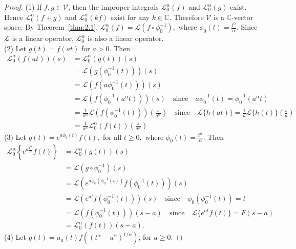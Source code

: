 \documentclass[two side,reqno,12pt]{amsart}
\numberwithin{equation}{section}
\theoremstyle{definition}
\begin{document}
\begin{proof}
 (1)  If \( f, g \in\mathcal{V} \), then the improper integrals \( \mathcal{L}_0^\alpha(f) \) and \( \mathcal{L}_0^\alpha(g) \) exist.
Hence \( \mathcal{L}_0^\alpha(f + g) \) and \( \mathcal{L}_0^\alpha(kf) \) exist for any \( k \in \mathbb{C} \).
Therefore \( \mathcal{V} \) is a \( \mathbb{C} \)-vector space.
By Theorem~\ref{thm:2.1},
\(\mathcal{L}_0^\alpha(f) = \mathcal{L}(f \circ \phi_0^{-1}),\)
where \( \phi_0(t) = \frac{t^\alpha}{\alpha} \).
Since \( \mathcal{L} \) is a linear operator, \( \mathcal{L}_0^\alpha \) is also a linear operator. \\
(2) Let \( g(t) = f(at) \) for \( a > 0 \).
Then 
\begin{align*}
\mathcal{L}_0^\alpha(f(at))(s)
          & =\mathcal{L}_0^\alpha(g(t))(s)\\
        &= \mathcal{L}(g(\phi_0^{-1}(t)))(s)\\
        & =\mathcal{L}(f(a\phi_0^{-1}(t)))(s)\\
        &=\mathcal{L}(f(\phi_0^{-1}(a^\alpha t)))(s)
        \quad\text{since}\quad  a\phi_0^{-1}(t) = \phi_0^{-1}(a^\alpha t) \\
         &= \frac{1}{a^\alpha} \mathcal{L}(f(\phi_0^{-1}(t)))\left( \frac{s}{a^\alpha} \right) \quad\text{since}\quad\mathcal{L}\{ h(at)\}=\frac{1}{a}\mathcal{L}\{h(t)\}\left( \frac{s}{a} \right)\\
     &=  \frac{1}{a^\alpha} \mathcal{L}_0^\alpha(f(t))\left( \frac{s}{a^\alpha} \right)
    \end{align*}
   (3) Let \(g(t) = e^{a \phi_0(t)} f(t),\) for all  \(t \geq 0,
   \) where \(\phi_0(t) = \frac{t^\alpha}{\alpha}.\)
   Then
     \begin{align*}
     \mathcal{L}_0^\alpha \left\{ e^{a\frac{t^\alpha}{\alpha}} f(t) \right\}
    &=\mathcal{L}_0^\alpha(g(t))(s)\\
    &= \mathcal{L}(g \circ \phi_0^{-1})(s)\\
   &= \mathcal{L}\left( e^{a \phi_0(\phi_0^{-1}(t))} f(\phi_0^{-1}(t)) \right)(s)\\
  &= \mathcal{L}\left( e^{a t} f(\phi_0^{-1}(t)) \right)(s)
  \quad\text{since}\quad \phi_0(\phi_0^{-1}(t)) = t\\
   &= \mathcal{L}\left( f(\phi_0^{-1}(t)) \right)(s - a)\quad\text{since}\quad \mathcal{L}\{e^{at}f(t)\}=F(s-a) \\
    & = \mathcal{L}_0^\alpha(f(t))(s - a).
  \end{align*}
(4) Let \(g(t) = u_a(t) f\!\left( (t^\alpha - a^\alpha)^{1/\alpha} \right)\), for  \(a \geq 0.\)

\end{proof}
\end{document}
